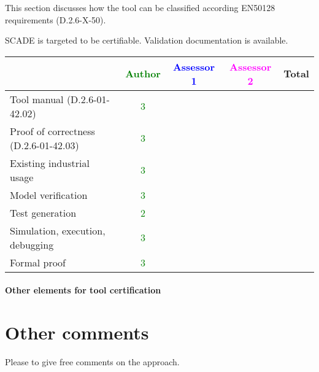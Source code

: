 This section discusses how the tool can be classified according EN50128 requirements (D.2.6-X-50).

\begin{author_comment}
SCADE is targeted to be certifiable. Validation documentation is available.   
\end{author_comment}


\begin{tabular}{|l | c | c | c | c|}
\hline
& \textcolor{green}{Author} & \textcolor{blue}{Assessor 1} & \textcolor{magenta}{Assessor 2} & Total \\
\hline 
Tool manual (D.2.6-01-42.02) & \textcolor{green}{3} & & &  \\
\hline
Proof of correctness (D.2.6-01-42.03)   & \textcolor{green}{3} & & & \\
\hline
Existing industrial  usage  & \textcolor{green}{3} & & & \\
\hline
Model verification & \textcolor{green}{3} & & & \\
\hline
Test generation & \textcolor{green}{2} & & & \\
\hline
Simulation, execution, debugging & \textcolor{green}{3} & & & \\
\hline
Formal proof & \textcolor{green}{3} & & & \\
\hline
\end{tabular}

\paragraph{Other elements for tool certification}

\section{Other comments}
Please to  give free comments on the approach.



